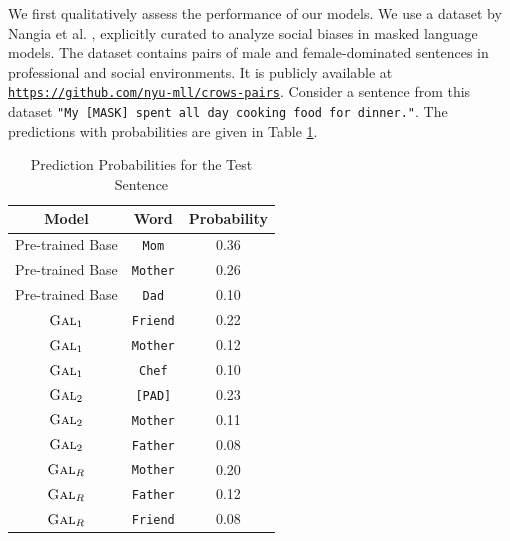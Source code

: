 \documentclass[10pt,twocolumn,letterpaper]{article}
\begin{document}
We first qualitatively assess the performance of our models.
We use a dataset by Nangia et al. \cite{test}, explicitly curated to analyze social biases in masked language models.
The dataset contains pairs of male and female-dominated sentences in professional and social environments.
It is publicly available at \href{https://github.com/nyu-mll/crows-pairs}{\texttt{https://github.com/nyu-mll/crows-pairs}}.
Consider a sentence from this dataset \texttt{"My [MASK] spent all day cooking food for dinner."}.
The predictions with probabilities are given in Table \ref{tab:probs}.
\begin{table}
    \centering
    \begin{tabular}{c|c|c}
         \textbf{Model} & \textbf{Word} & \textbf{Probability} \\
         \hline
         Pre-trained Base & \texttt{Mom} & 0.36 \\
         Pre-trained Base & \texttt{Mother} & 0.26 \\
         Pre-trained Base & \texttt{Dad} & 0.10 \\
         \hline
         $\textsc{Gal}_{1}$ & \texttt{Friend} & 0.22 \\
         $\textsc{Gal}_{1}$ & \texttt{Mother} & 0.12 \\
         $\textsc{Gal}_{1}$ & \texttt{Chef} & 0.10 \\
         \hline
         $\textsc{Gal}_{2}$ & \texttt{[PAD]} & 0.23 \\
         $\textsc{Gal}_{2}$ & \texttt{Mother} & 0.11 \\
         $\textsc{Gal}_{2}$ & \texttt{Father} & 0.08 \\
         \hline
         $\textsc{Gal}_{R}$ & \texttt{Mother} & 0.20 \\
         $\textsc{Gal}_{R}$ & \texttt{Father} & 0.12 \\
         $\textsc{Gal}_{R}$ & \texttt{Friend} & 0.08
    \end{tabular}
    \caption{Prediction Probabilities for the Test Sentence}
    \label{tab:probs}
\end{table}
\end{document}
